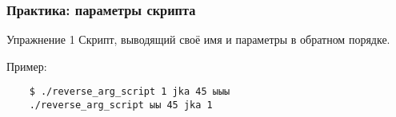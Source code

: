 \begin{frame}[fragile]
  \frametitle{Практика: параметры скрипта}

  \alert{Упражнение 1} Скрипт, выводящий своё имя и параметры в обратном порядке.

  Пример:
  \begin{verbatim}
    $ ./reverse_arg_script 1 jka 45 ыыы
    ./reverse_arg_script ыы 45 jka 1
  \end{verbatim}

\end{frame}
